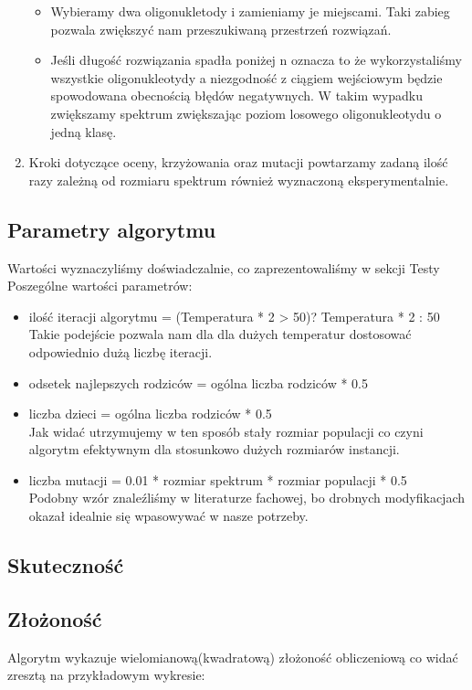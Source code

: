 \documentclass{article}
\begin{document}
\begin{enumerate}
\begin{itemize}
\item Wybieramy dwa oligonukletody i zamieniamy je miejscami. Taki zabieg pozwala zwiększyć nam przeszukiwaną przestrzeń rozwiązań.
\item Jeśli długość rozwiązania spadła poniżej n oznacza to że wykorzystaliśmy wszystkie oligonukleotydy a niezgodność z ciągiem wejściowym będzie spowodowana obecnością błędów negatywnych. W takim wypadku zwiększamy spektrum zwiększając poziom losowego oligonukleotydu o jedną klasę.
\end{itemize}	
\item Kroki dotyczące oceny, krzyżowania oraz mutacji powtarzamy zadaną ilość razy zależną od rozmiaru spektrum również wyznaczoną eksperymentalnie.
\end{enumerate}
\subsection{Parametry algorytmu}
Wartości wyznaczyliśmy doświadczalnie, co zaprezentowaliśmy w sekcji Testy
Poszególne wartości parametrów:
\begin{itemize}
\item ilość iteracji algorytmu = (Temperatura * 2 > 50)? Temperatura * 2 : 50
\\Takie podejście pozwala nam dla dla dużych temperatur dostosować odpowiednio dużą liczbę iteracji.
\item odsetek najlepszych rodziców = ogólna liczba rodziców * 0.5
\item liczba dzieci = ogólna liczba rodziców * 0.5
\\Jak widać utrzymujemy w ten sposób stały rozmiar populacji co czyni algorytm efektywnym dla stosunkowo dużych rozmiarów instancji.
\item liczba mutacji = 0.01 * rozmiar spektrum * rozmiar populacji * 0.5
\\Podobny wzór znaleźliśmy w literaturze fachowej, bo drobnych modyfikacjach okazał idealnie się wpasowywać w nasze potrzeby.
\end{itemize}
\subsection{Skuteczność}

\subsection{Złożoność}
Algorytm wykazuje wielomianową(kwadratową) złożoność obliczeniową co
widać zresztą na przykładowym wykresie:
\end{document}
